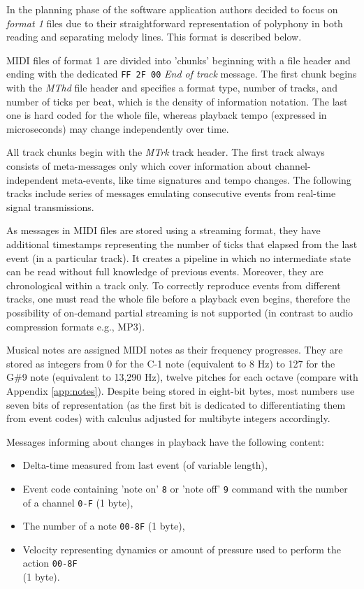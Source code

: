 \documentclass[a4paper, 11pt, twoside]{report}
\theoremstyle{definition}
\begin{document}
In the planning phase of the software application authors decided to focus on \textit{format 1} files due to their straightforward representation of polyphony in both reading and separating melody lines. This format is described below. \par
MIDI files of format 1 are divided into 'chunks' beginning with a file header and ending with the dedicated \texttt{FF 2F 00} \textit{End of track} message. The first chunk begins with the \textit{MThd} file header and specifies a format type, number of tracks, and number of ticks per beat, which is the density of information notation. The last one is hard coded for the whole file, whereas playback tempo (expressed in microseconds) may change independently over time. \par
All track chunks begin with the \textit{MTrk} track header. The first track always consists of meta-messages only which cover information about channel-independent meta-events, like time signatures and tempo changes. The following tracks include series of messages emulating consecutive events from real-time signal transmissions. \par
As messages in MIDI files are stored using a streaming format, they have additional timestamps representing the number of ticks that elapsed from the last event (in a particular track). It creates a pipeline in which no intermediate state can be read without full knowledge of previous events. Moreover, they are chronological within a track only. To correctly reproduce events from different tracks, one must read the whole file before a playback even begins, therefore the possibility of on-demand partial streaming is not supported (in contrast to audio compression formats e.g., MP3). \par
Musical notes are assigned MIDI notes as their frequency progresses. They are stored as integers from 0 for the C-1 note (equivalent to 8 Hz) to 127 for the G\#9 note (equivalent to 13,290 Hz), twelve pitches for each octave (compare with Appendix \ref{app:notes}). Despite being stored in eight-bit bytes, most numbers use seven bits of representation (as the first bit is dedicated to differentiating them from event codes) with calculus adjusted for multibyte integers accordingly. \par
Messages informing about changes in playback have the following content:

\begin{itemize}
    \item Delta-time measured from last event (of variable length),
    \item Event code containing 'note on' \texttt{8} or 'note off' \texttt{9} command with the number of a channel \texttt{0-F} (1 byte),
    \item The number of a note \texttt{00-8F} (1 byte),
    \item Velocity representing dynamics or amount of pressure used to perform the action \texttt{00-8F} \\ (1 byte).
\end{itemize} \par
\end{document}
